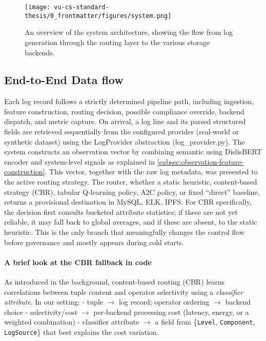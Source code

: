 \begin{figure}[H]
\centering
\texttt{[image: vu-cs-standard-thesis/0\_frontmatter/figures/system.png]}
\caption{An overview of the system architecture, showing the flow from log generation through the routing layer to the various storage backends.}
\label{fig:system-architecture}
\end{figure}



\subsection{End-to-End Data flow}
Each log record follows a strictly determined pipeline path, including ingestion, feature construction, routing decision, possible compliance override, backend dispatch, and metric capture. On arrival, a log line and its parsed structured fields are retrieved sequentially from the configured provider (real-world or synthetic dataset) using the LogProvider abstraction (log\_provider.py). 
The system constructs an observation vector by combining semantic using DislisBERT encoder and system-level signals as explained in \ref{subsec:observation-feature-construction}. This vector, together with the raw log metadata, was presented to the active routing strategy. 
The router, whether a static heuristic, content-based strategy (CBR), tabular Q‑learning policy, A2C policy, or fixed “direct” baseline, returns a provisional destination in {MySQL, ELK, IPFS}. For CBR specifically, the decision first consults bucketed attribute statistics; if these are not yet reliable, it may fall back to global averages, and if these are absent, to the static heuristic. This is the only branch that meaningfully changes the control flow before governance and mostly appears during cold starts.

\paragraph{A brief look at the CBR fallback in code}
As introduced in the background, content-based routing (CBR) learns correlations between tuple content and operator selectivity using a \emph{classifier attribute}. In our setting:
- tuple $\rightarrow$ log record; operator ordering $\rightarrow$ backend choice
- selectivity/cost $\rightarrow$ per-backend processing cost (latency, energy, or a weighted combination)
- classifier attribute $\rightarrow$ a field from \{\texttt{Level}, \texttt{Component}, \texttt{LogSource}\} that best explains the cost variation.

